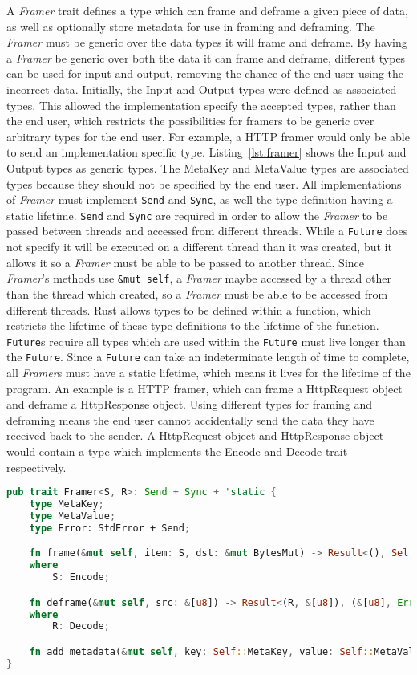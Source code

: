 \documentclass{l4proj}
\begin{document}
A \emph{Framer} trait defines a type which can frame and deframe a given piece of data, as well as optionally store
metadata for use in framing and deframing.
The \emph{Framer} must be generic over the data types it will frame and deframe.
By having a \emph{Framer} be generic over both the data it can frame and deframe, different types can be used for input
and output, removing the chance of the end user using the incorrect data.
Initially, the Input and Output types were defined as associated types.
This allowed the implementation specify the accepted types, rather than the end user, which restricts the possibilities
for framers to be generic over arbitrary types for the end user.
For example, a HTTP framer would only be able to send an implementation specific type.
Listing~\ref{lst:framer} shows the Input and Output types as generic types.
The MetaKey and MetaValue types are associated types because they should not be specified by the end user.
All implementations of \emph{Framer} must implement \texttt{Send} and \texttt{Sync}, as well the type definition having
a static lifetime.
\texttt{Send} and \texttt{Sync} are required in order to allow the \emph{Framer} to be passed between threads and
accessed from different threads.
While a \texttt{Future} does not specify it will be executed on a different thread than it was created, but it allows
it so a \emph{Framer} must be able to be passed to another thread.
Since \emph{Framer}'s methods use \texttt{&mut self}, a \emph{Framer} maybe accessed by a thread other than the thread
which created, so a \emph{Framer} must be able to be accessed from different threads.
Rust allows types to be defined within a function, which restricts the lifetime of these type definitions to the
lifetime of the function.
\texttt{Future}s require all types which are used within the \texttt{Future} must live longer than the \texttt{Future}.
Since a \texttt{Future} can take an indeterminate length of time to complete, all \emph{Framer}s must have a static
lifetime, which means it lives for the lifetime of the program.
An example is a HTTP framer, which can frame a HttpRequest object and deframe a HttpResponse object.
Using different types for framing and deframing means the end user cannot accidentally send the data they have received
back to the sender.
A HttpRequest object and HttpResponse object would contain a type which implements the Encode and Decode trait
respectively.

\begin{lstlisting}[language=Rust, float=h, label=lst:framer, caption={The Framer trait, showing the Send and 'static
    requirements for all implementers, and associated types.}]
pub trait Framer<S, R>: Send + Sync + 'static {
    type MetaKey;
    type MetaValue;
    type Error: StdError + Send;

    fn frame(&mut self, item: S, dst: &mut BytesMut) -> Result<(), Self::Error>
    where
        S: Encode;

    fn deframe(&mut self, src: &[u8]) -> Result<(R, &[u8]), (&[u8], Error<Self::Error>)>
    where
        R: Decode;

    fn add_metadata(&mut self, key: Self::MetaKey, value: Self::MetaValue);
}
\end{lstlisting}
\end{document}
